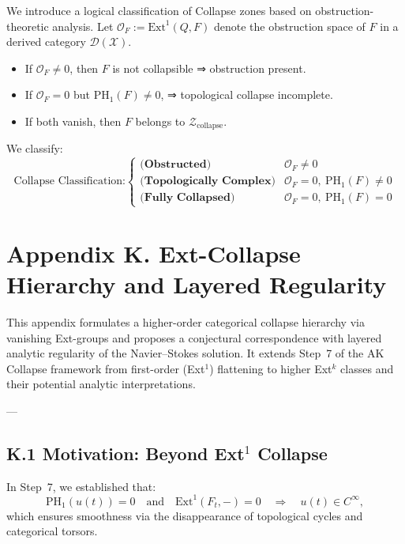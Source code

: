 \documentclass[11pt]{article}
\theoremstyle{definition}
\begin{document}
We introduce a logical classification of Collapse zones based on obstruction-theoretic analysis.  
Let $\mathcal{O}_F := \mathrm{Ext}^1(Q, F)$ denote the obstruction space of $F$ in a derived category $\mathcal{D}(\mathcal{X})$.

\begin{itemize}
  \item If $\mathcal{O}_F \ne 0$, then $F$ is not collapsible ⇒ obstruction present.
  \item If $\mathcal{O}_F = 0$ but $\mathrm{PH}_1(F) \ne 0$, ⇒ topological collapse incomplete.
  \item If both vanish, then $F$ belongs to $\mathcal{Z}_{\mathrm{collapse}}$.
\end{itemize}

We classify:
\[
\text{Collapse Classification:}
\begin{cases}
\textbf{(Obstructed)} & \mathcal{O}_F \ne 0 \\
\textbf{(Topologically Complex)} & \mathcal{O}_F = 0, \ \mathrm{PH}_1(F) \ne 0 \\
\textbf{(Fully Collapsed)} & \mathcal{O}_F = 0, \ \mathrm{PH}_1(F) = 0
\end{cases}
\]





\section*{Appendix K. Ext-Collapse Hierarchy and Layered Regularity}

This appendix formulates a higher-order categorical collapse hierarchy via vanishing Ext-groups and proposes a conjectural correspondence with layered analytic regularity of the Navier--Stokes solution.  
It extends Step~7 of the AK Collapse framework from first-order (Ext$^1$) flattening to higher Ext$^k$ classes and their potential analytic interpretations.

---

\subsection*{K.1 Motivation: Beyond Ext$^1$ Collapse}

In Step~7, we established that:
\[
\mathrm{PH}_1(u(t)) = 0 \quad \text{and} \quad \mathrm{Ext}^1(F_t, -) = 0 \quad \Rightarrow \quad u(t) \in C^\infty,
\]
which ensures smoothness via the disappearance of topological cycles and categorical torsors.
\end{document}
